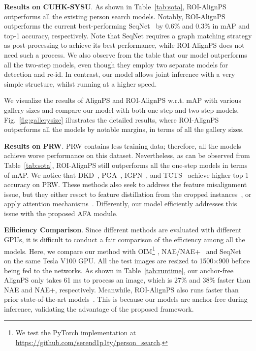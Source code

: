 \documentclass[journal]{IEEEtran}
\begin{document}
\textbf{Results on CUHK-SYSU}.
As shown in Table~\ref{tab:sota}, ROI-AlignPS outperforms all the existing person search models. Notably, ROI-AlignPS outperforms the current best-performing SeqNet~\cite{DBLP:conf/aaai/LiM21} by 0.6\% and 0.3\% in mAP and top-1 accuracy, respectively. Note that SeqNet requires a graph matching strategy as post-processing to achieve its best performance, while ROI-AlignPS does not need such a process.
We also observe from the table that our model outperforms all the two-step models, even though they employ two separate models for detection and re-id. In contrast, our model allows joint inference with a very simple structure, whilst running at a higher speed. 

We visualize the results of AlignPS and ROI-AlignPS w.r.t. mAP with various gallery sizes and compare our model with both one-step and two-step models. Fig.~\ref{fig:gallerysize} illustrates the detailed results, where ROI-AlignPS outperforms all the models by notable margins, in terms of all the gallery sizes.


\textbf{Results on PRW}.
PRW contains less training data; therefore, all the models achieve worse performance on this dataset. Nevertheless, as can be observed from Table~\ref{tab:sota}, ROI-AlignPS still outperforms all the one-step models in terms of mAP. We notice that DKD~\cite{DBLP:conf/aaai/ZhangWBSY21}, PGA~\cite{Kim_2021_CVPR}, IGPN~\cite{DBLP:conf/cvpr/DongZST20}, and TCTS~\cite{DBLP:conf/cvpr/WangMCSC20} achieve higher top-1 accuracy on PRW. These methods also seek to address the feature misalignment issue, but they either resort to feature distillation from the cropped instances~\cite{DBLP:conf/aaai/ZhangWBSY21,DBLP:conf/cvpr/DongZST20,DBLP:conf/cvpr/WangMCSC20}, or apply attention mechanisms~\cite{Kim_2021_CVPR}. Differently, our model efficiently addresses this issue with the proposed AFA module.


\textbf{Efficiency Comparison}.
Since different methods are evaluated with different GPUs, it is difficult to conduct a fair comparison of the efficiency among all the models. Here, we compare our method with OIM\footnote{We test the PyTorch implementation at \url{https://github.com/serend1p1ty/person_search}.} \cite{DBLP:conf/cvpr/XiaoLWLW17}, NAE/NAE+~\cite{DBLP:conf/cvpr/ChenZYS20} and SeqNet~\cite{DBLP:conf/aaai/LiM21} on the same Tesla V100 GPU. All the test images are resized to 1500$\times$900 before being fed to the networks. As shown in Table~\ref{tab:runtime}, our anchor-free AlignPS only takes 61 ms to process an image, which is 27\% and 38\% faster than NAE and NAE+, respectively. Meanwhile, ROI-AlignPS also runs faster than prior state-of-the-art models~\cite{DBLP:conf/cvpr/ChenZYS20,DBLP:conf/aaai/LiM21}. This is because our models are anchor-free during inference, validating the advantage of the proposed framework.
\end{document}
